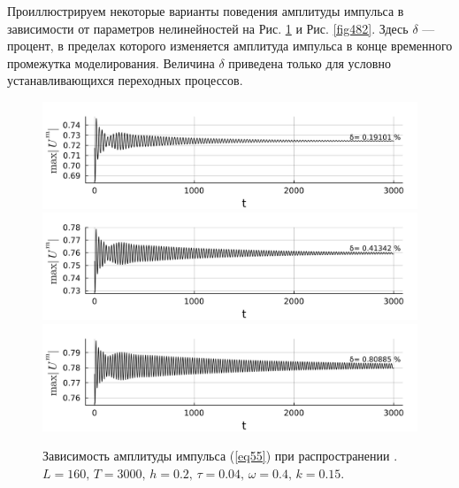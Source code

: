 \documentclass[14pt,a4paper]{extreport}
\begin{document}
			Проиллюстрируем некоторые варианты поведения амплитуды импульса в зависимости от параметров нелинейностей на Рис. \ref{fig481} и Рис. \ref{fig482}. Здесь \(\delta\) — процент, в пределах которого изменяется амплитуда импульса в конце временного промежутка моделирования. Величина \(\delta\) приведена только для условно устанавливающихся переходных процессов.
			\begin{figure}[H] %
				\begin{minipage}[h]{0.8\linewidth}
					\includegraphics[width=1\linewidth]{fig35.png}
					\label{fig48_1}
					\includegraphics[width=1\linewidth]{fig36.png}
					\label{fig48_2}
					\includegraphics[width=1\linewidth]{fig84.png}
					\label{fig48_3}
				\end{minipage}
				\caption{Зависимость амплитуды импульса (\ref{eq55}) при распространении .
				\(L=160,\, T=3000,\, h=0.2,\, \tau=0.04,\, \omega=0.4,\, k=0.15\).}
				\label{fig481}
			\end{figure}
\end{document}

